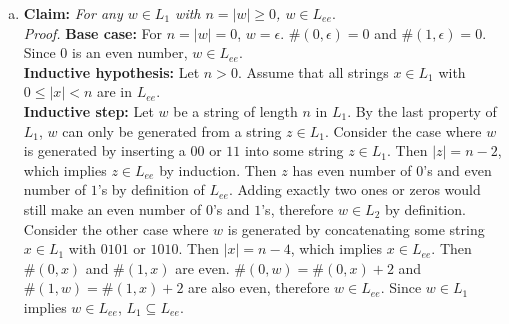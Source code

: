 \documentclass[11pt]{article}
\begin{document}

\begin{solution}
\begin{enumerate}[(a)]
\item
\textbf{Claim: }\emph{For any $w\in L_{1}$ with $n = \lvert w \rvert \geq 0$, $w\in L_{ee}$}.\\
\emph{Proof.} \textbf{Base case: } For $n = \lvert w \rvert = 0$, $w=\epsilon$. $\#(0, \epsilon)=0$ and $\#(1, \epsilon)=0$. Since $0$ is an even number, $w\in L_{ee}$.\\
\textbf{Inductive hypothesis: } Let $n > 0$. Assume that all strings $x\in L_{1}$ with $0 \leq \lvert x \rvert < n$ are in $L_{ee}$.\\
\textbf{Inductive step: } Let $w$ be a string of length $n$ in $L_{1}$. By the last property of $L_{1}$, $w$ can only be generated from a string $z\in L_{1}$. Consider the case where $w$ is generated by inserting a $00$ or $11$ into some string $z\in L_{1}$. Then $\lvert z \rvert = n-2$, which implies $z\in L_{ee}$ by induction. Then $z$ has even number of $0$'s and even number of $1$'s by definition of $L_{ee}$. Adding exactly two ones or zeros would still make an even number of $0$'s and $1$'s, therefore $w\in L_{2}$ by definition. Consider the other case where $w$ is generated by concatenating some string $x\in L_{1}$ with $0101$ or $1010$. Then $\lvert x \rvert=n-4$, which implies $x\in L_{ee}$. Then $\#(0, x)$ and $\#(1, x)$ are even. $\#(0, w)=\#(0, x)+2$ and $\#(1, w)=\#(1, x)+2$ are also even, therefore $w\in L_{ee}$.
Since $w\in L_{1}$ implies $w\in L_{ee}$, $L_{1}\subseteq L_{ee}$.


\end{enumerate}
\end{solution}
\end{document}
